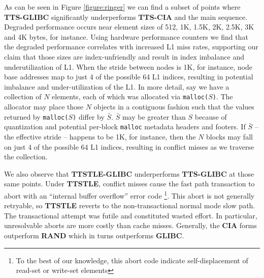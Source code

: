 \documentclass[preprint]{sigplanconf}
\begin{document}
As can be seen in Figure \ref{figure:ringer} we can find a subset of points where 
\textbf{TTS-GLIBC} significantly underperforms \textbf{TTS-CIA} and the main sequence.
Degraded performance occurs near element sizes of 512, 1K, 1.5K, 2K, 2.5K, 3K and 
4K bytes, for instance.  Using hardware performance counters we find that the
degraded performance correlates with increased L1 miss rates, supporting our
claim that those sizes are index-unfriendly and result in index imbalance and
underutilization of L1.  When the stride between nodes is 1K, for instance,
node base addresses map to just 4 of the possible 64 L1 indices, resulting
in potential imbalance and under-utilization of the L1.  In more detail,
say we have a collection of $N$ elements, each of which was allocated via 
\texttt{malloc($S$)}. The allocator may place those $N$ objects in a contiguous
fashion such that the values returned by \texttt{malloc($S$)} differ by $\bar{S}$.
$\bar{S}$ may be greater than $S$ because of quantization and potential per-block
\texttt{malloc} metadata headers and footers.   If $\bar{S}$ -- the effective stride -- 
happens to be 1K, for instance, then the $N$ blocks may fall on just 4 of the 
possible 64 L1 indices, resulting in conflict misses as we traverse the collection. 

We also observe that \textbf{TTSTLE-GLIBC} underperforms
\textbf{TTS-GLIBC} at those same points.  Under \textbf{TTSTLE}, conflict
misses cause the fast path transaction to abort with an ``internal buffer overflow'' 
error code \footnote{To the best of our knowledge, this abort code indicate self-displacement
of read-set or write-set elements}.  
This abort is not generally retryable, so \textbf{TTSTLE} reverts to the 
non-transactional normal mode slow path.  
The transactional attempt was futile and constituted wasted effort.  In particular, 
unresolvable aborts are more costly than cache misses.  Generally,
the \textbf{CIA} forms outperform \textbf{RAND} which in turns outperforms \textbf{GLIBC}.
\end{document}
